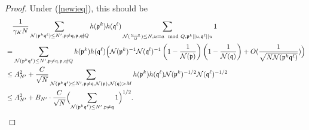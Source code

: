 \documentclass[11pt]{amsart}
\theoremstyle{definition}
\newcommand{\NN}{{\mathcal N}}
\newcommand{\mf}{\mathfrak}
\begin{document}
\begin{proof}
{Under (\ref{newieq}), this should be 
\begin{equation}\label{secondTK3}
    \begin{split}
        &\quad \frac{1}{\gamma_{K} N}\sum_{\NN(\mf p^{k}\mf q^{\ell}) \leq N', \mf p\neq \mf q,\mf p,\mf q\nmid Q} h(\mf p^{k})h(\mf q^{\ell})\sum_{\NN(\frac{u-a}{Q})\leq N, u\equiv a \mod Q, \mf p^{k}||u, \mf q^{\ell}||u}1
        \\&=\sum_{\NN(\mf p^{k}\mf q^{\ell})\leq N', \mf p\neq \mf q, \mf p,\mf q\nmid Q} h(\mf p^{k})h(\mf q^{\ell})\Bigl(\NN(\mf p^k)^{-1}\NN(\mf q^l)^{-1}\left(1-\frac{1}{\NN(\mf p)}\right) \left(1-\frac{1}{\NN(\mf q)}\right)+O(\frac{1}{\sqrt{N\NN(\mf p^{k}\mf q^{\ell})}})\Bigr)
        \\&\leq A_{N'}^{2}+\frac{C}{\sqrt{N}}\sum_{\NN(\mf p^{k}\mf q^{\ell})\leq N', \mf p\neq \mf q, \NN(\mf p),\NN(\mf q)>M} h(\mf p^{k})h(\mf q^{\ell})\NN(\mf p^{k})^{-1/2}\NN(\mf q^{\ell})^{-1/2}     %
        \\&\leq A_{N'}^{2}+B_{N'}\cdot\frac{C}{\sqrt{N}}\Bigl(\sum_{\NN(\mf p^{k}\mf q^{\ell})\leq N', \mf p\neq \mf q} 1\Bigr)^{1/2}.
            \end{split}
\end{equation}
}


\end{proof}
\end{document}
